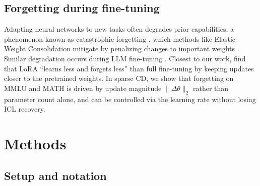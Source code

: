\documentclass{article} %
\newcommand{\todo}[1]{{\color{red}[TODO: #1]}}
\begin{document}
\subsection{Forgetting during fine-tuning}

Adapting neural networks to new tasks often degrades prior capabilities, a phenomenon known as catastrophic forgetting \citep{mccloskey1989catastrophic}, which methods like Elastic Weight Consolidation mitigate by penalizing changes to important weights \citep{kirkpatrick2017ewc}. Similar degradation occurs during LLM fine-tuning \citep{luo2023forgetting}. Closest to our work, \citet{biderman2024lora} find that LoRA ``learns less and forgets less'' than full fine-tuning by keeping updates closer to the pretrained weights. In sparse CD, we show that forgetting on MMLU and MATH is driven by update magnitude $\|\Delta\theta\|_2$ rather than parameter count alone, and can be controlled via the learning rate without losing ICL recovery.


\section{Methods}
\label{sec:methods}

\subsection{Setup and notation}
\end{document}
